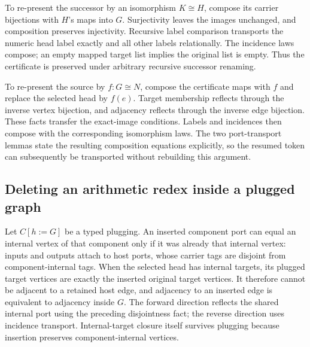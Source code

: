 To re-present the successor by an isomorphism $K\cong H$, compose its carrier
bijections with $H$'s maps into $G$. Surjectivity leaves the images unchanged,
and composition preserves injectivity. Recursive label comparison transports
the numeric head label exactly and all other labels relationally. The incidence
laws compose; an empty mapped target list implies the original list is empty.
Thus the certificate is preserved under arbitrary recursive successor renaming.


To re-present the source by $f:G\cong N$, compose the certificate maps with
$f$ and replace the selected head by $f(e)$. Target membership reflects through
the inverse vertex bijection, and adjacency reflects through the inverse edge
bijection. These facts transfer the exact-image conditions. Labels and incidences
then compose with the corresponding isomorphism laws. The two port-transport
lemmas state the resulting composition equations explicitly, so the resumed
token can subsequently be transported without rebuilding this argument.




\subsection{Deleting an arithmetic redex inside a plugged graph}

Let $C[h:=G]$ be a typed plugging. An inserted component port can equal an
internal vertex of that component only if it was already that internal vertex:
inputs and outputs attach to host ports, whose carrier tags are disjoint from
component-internal tags. When the selected head has internal targets, its
plugged target vertices are exactly the inserted original target vertices.
It therefore cannot be adjacent to a retained host edge, and adjacency to an
inserted edge is equivalent to adjacency inside $G$. The forward direction
reflects the shared internal port using the preceding disjointness fact; the
reverse direction uses incidence transport. Internal-target closure itself
survives plugging because insertion preserves component-internal vertices.

